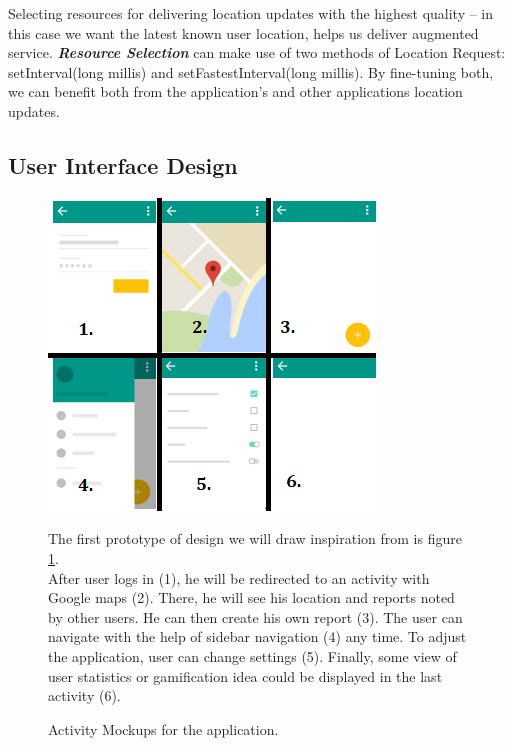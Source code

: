 Selecting resources for delivering location updates with the highest quality – in this case we want the latest known user location, helps us deliver augmented service. \textbf{\textit{Resource Selection}} can make use of two methods of Location Request: setInterval(long millis) and setFastestInterval(long millis). By fine-tuning both, we can benefit both from the application's and other applications location updates.


\subsection{User Interface Design} \label{sec:uidesign}
\begin{figure}[H]
\begin{minipage}{.55\textwidth}
\includegraphics[width=\textwidth]{images/activityDesign}
\caption{Activity Mockups for the application.} \label{fig:activity_design}
\end{minipage}
\hfill
\begin{minipage}{.4\textwidth}
The first prototype of design we will draw inspiration from is figure \ref{fig:activity_design}.
~\\

After user logs in (1), he will be redirected to an activity with Google maps (2). There, he will see his location and reports noted by other users. He can then create his own report (3). The user can navigate with the help of sidebar navigation (4) any time. To adjust the application, user can change settings (5). Finally, some view of user statistics or gamification idea could be displayed in the last activity (6).
\end{minipage}
\end{figure}